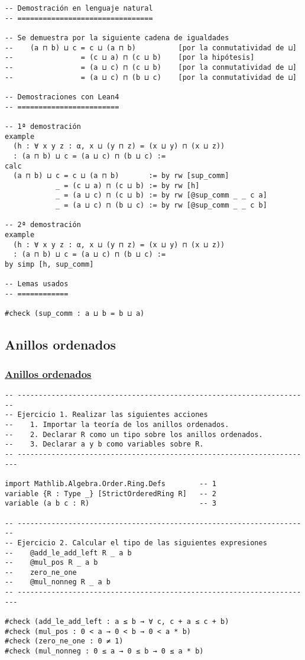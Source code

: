 \begin{verbatim}
-- Demostración en lenguaje natural
-- ================================

-- Se demuestra por la siguiente cadena de igualdades
--    (a ⊓ b) ⊔ c = c ⊔ (a ⊓ b)          [por la conmutatividad de ⊔]
--                = (c ⊔ a) ⊓ (c ⊔ b)    [por la hipótesis]
--                = (a ⊔ c) ⊓ (c ⊔ b)    [por la conmutatividad de ⊔]
--                = (a ⊔ c) ⊓ (b ⊔ c)    [por la conmutatividad de ⊔]

-- Demostraciones con Lean4
-- ========================

-- 1ª demostración
example
  (h : ∀ x y z : α, x ⊔ (y ⊓ z) = (x ⊔ y) ⊓ (x ⊔ z))
  : (a ⊓ b) ⊔ c = (a ⊔ c) ⊓ (b ⊔ c) :=
calc
  (a ⊓ b) ⊔ c = c ⊔ (a ⊓ b)       := by rw [sup_comm]
            _ = (c ⊔ a) ⊓ (c ⊔ b) := by rw [h]
            _ = (a ⊔ c) ⊓ (c ⊔ b) := by rw [@sup_comm _ _ c a]
            _ = (a ⊔ c) ⊓ (b ⊔ c) := by rw [@sup_comm _ _ c b]

-- 2ª demostración
example
  (h : ∀ x y z : α, x ⊔ (y ⊓ z) = (x ⊔ y) ⊓ (x ⊔ z))
  : (a ⊓ b) ⊔ c = (a ⊔ c) ⊓ (b ⊔ c) :=
by simp [h, sup_comm]

-- Lemas usados
-- ============

#check (sup_comm : a ⊔ b = b ⊔ a)
\end{verbatim}

\subsection{Anillos ordenados}
\label{sec:orgd9d495b}

\subsubsection{\href{./src/Basicos/Anillos\_ordenados.lean}{Anillos ordenados}}
\label{sec:orgfd117d0}
\begin{verbatim}
-- ---------------------------------------------------------------------
-- Ejercicio 1. Realizar las siguientes acciones
--    1. Importar la teoría de los anillos ordenados.
--    2. Declarar R como un tipo sobre los anillos ordenados.
--    3. Declarar a y b como variables sobre R.
-- ----------------------------------------------------------------------

import Mathlib.Algebra.Order.Ring.Defs        -- 1
variable {R : Type _} [StrictOrderedRing R]   -- 2
variable (a b c : R)                          -- 3

-- ---------------------------------------------------------------------
-- Ejercicio 2. Calcular el tipo de las siguientes expresiones
--    @add_le_add_left R _ a b
--    @mul_pos R _ a b
--    zero_ne_one
--    @mul_nonneg R _ a b
-- ----------------------------------------------------------------------

#check (add_le_add_left : a ≤ b → ∀ c, c + a ≤ c + b)
#check (mul_pos : 0 < a → 0 < b → 0 < a * b)
#check (zero_ne_one : 0 ≠ 1)
#check (mul_nonneg : 0 ≤ a → 0 ≤ b → 0 ≤ a * b)
\end{verbatim}

